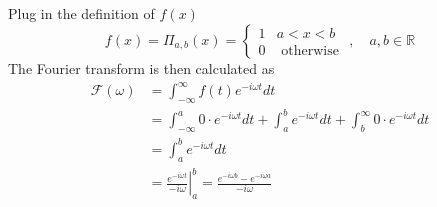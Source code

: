 \documentclass{article}
\begin{document}
\subsection{}
Plug in the definition of $f(x)$
\[
	f(x)= \Pi_{a, b}(x)=\left\{\begin{array}{ll}{1} & {a<x<b} \\ {0} & {\text { otherwise }}\end{array}\right., \quad a, b \in \mathbb{R}
\]
The Fourier transform is then calculated as 
\begin{align*}
	\mathcal{F}(\omega)&=\int_{-\infty}^{\infty} f(t) e^{-i \omega t} d t \\ 
	&=\int_{-\infty}^{a} 0\cdot  e^{-i \omega t} d t +\int_{a}^{b} e^{-i \omega t} d t +\int_{b}^{\infty} 0\cdot  e^{-i \omega t} d t \\
	&= \int_{a}^{b} e^{-i \omega t} d t  \\
	&= \left. \frac{e^{-i \omega t}}{-i \omega} \right|_a^b = \frac{e^{-i \omega b}-e^{-i \omega a}}{-i \omega}
\end{align*}
\end{document}
